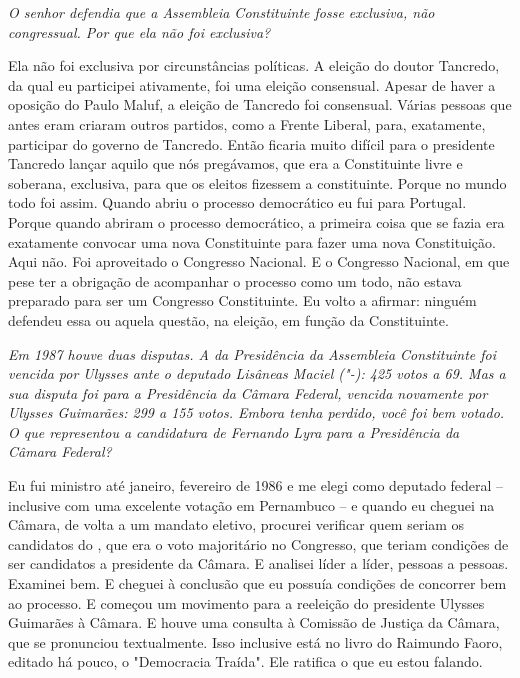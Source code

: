 \medskip

\emph{O senhor defendia que a Assembleia Constituinte fosse exclusiva,
não congressual. Por que ela não foi exclusiva?}

Ela não foi exclusiva por circunstâncias políticas. A
eleição do doutor Tancredo, da qual eu participei ativamente, foi uma
eleição consensual. Apesar de haver a oposição do Paulo Maluf, a eleição
de Tancredo foi consensual. Várias pessoas que antes eram  criaram
outros partidos, como a Frente Liberal, para, exatamente, participar do
governo de Tancredo. Então ficaria muito difícil para o presidente
Tancredo lançar aquilo que nós pregávamos, que era a Constituinte livre
e soberana, exclusiva, para que os eleitos fizessem a constituinte.
Porque no mundo todo foi assim. Quando abriu o processo democrático eu
fui para Portugal. Porque quando abriram o processo democrático, a
primeira coisa que se fazia era exatamente convocar uma nova
Constituinte para fazer uma nova Constituição. Aqui não. Foi aproveitado
o Congresso Nacional. E o Congresso Nacional, em que pese ter a
obrigação de acompanhar o processo como um todo, não estava preparado
para ser um Congresso Constituinte. Eu volto a afirmar: ninguém defendeu
essa ou aquela questão, na eleição, em função da Constituinte.

\medskip

\emph{Em 1987 houve duas disputas. A da Presidência da Assembleia
Constituinte foi vencida por Ulysses ante o deputado Lisâneas Maciel
("-): 425 votos a 69. Mas a sua disputa foi para a Presidência da
Câmara Federal, vencida novamente por Ulysses Guimarães: 299 a 155
votos. Embora tenha perdido, você foi bem votado. O que representou a
candidatura de Fernando Lyra para a Presidência da Câmara Federal?}

Eu fui ministro até janeiro, fevereiro de 1986 e me elegi
como deputado federal -- inclusive com uma excelente votação em
Pernambuco -- e quando eu cheguei na Câmara, de volta a um mandato
eletivo, procurei verificar quem seriam os candidatos do , que era o
voto majoritário no Congresso, que teriam condições de ser candidatos a
presidente da Câmara. E analisei líder a líder, pessoas a pessoas.
Examinei bem. E cheguei à conclusão que eu possuía condições de
concorrer bem ao processo. E começou um movimento para a reeleição do
presidente Ulysses Guimarães à Câmara. E houve uma consulta à Comissão
de Justiça da Câmara, que se pronunciou textualmente. Isso inclusive
está no livro do Raimundo Faoro, editado há pouco, o "Democracia
Traída". Ele ratifica o que eu estou falando.

